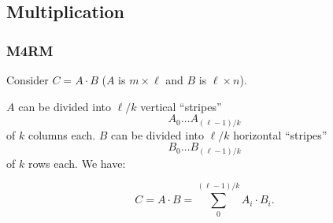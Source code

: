 \documentclass[11pt]{beamer}
\begin{document}
\subsection{Multiplication}

\begin{frame}
\frametitle{M4RM~\cite{ADKF70}}
Consider $C = A \cdot B$ ($A$ is $m \times \ell$ and $B$ is $\ell \times n$). 

\vspace{0.2cm}

$A$ can be divided into $\ell/k$ vertical ``stripes'' $$A_0 \dots A_{(\ell-1)/k}$$ of
$k$ columns each.  $B$ can be divided into $\ell/k$ horizontal ``stripes'' $$B_0 \dots B_{(\ell-1)/k}$$ of
$k$ rows each. We have:

\[
C = A \cdot B = \sum_0^{(\ell-1)/k} A_i \cdot B_i. 
\]

\framebreak


\end{frame}
\end{document}
